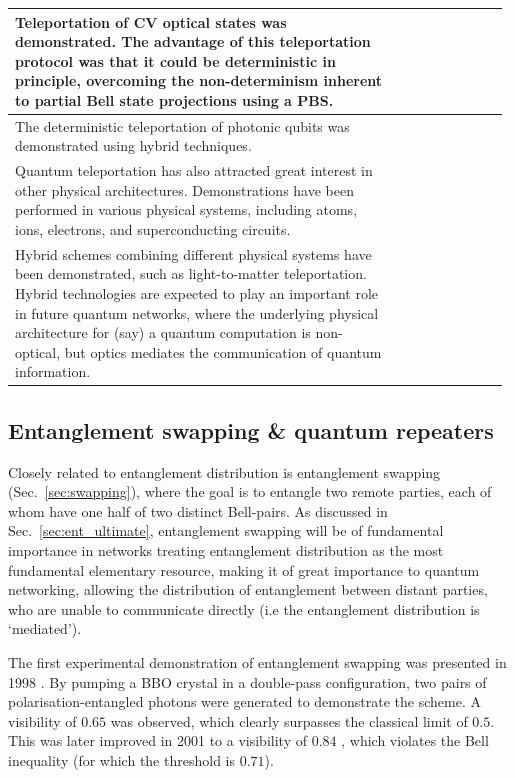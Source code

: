 \documentclass[aps,rmp,twocolumn,amsmath,amssymb,nofootinbib,superscriptaddress,longbibliography,floatfix,table-of-contents,eqsecnum]{revtex4-1}
\begin{document}
\begin{table}[!htb]
\begin{tabular}{|p{0.755\linewidth}|p{0.22\linewidth}|}
	\hline
	Teleportation of CV optical states was demonstrated. The advantage of this teleportation protocol was that it could be deterministic in principle,  overcoming the non-determinism inherent to partial Bell state projections using a PBS. & \cite{bib:Science_282_706} \\
	\hline
	The deterministic teleportation of photonic qubits was demonstrated using hybrid techniques. & \cite{bib:Nat_500_315} \\
	\hline
	Quantum teleportation has also attracted great interest in other physical architectures. Demonstrations have been performed in various physical systems, including atoms, ions, electrons, and superconducting circuits. & \cite{bib:Nat_Phys_9_400, bib:Nat_429_734, bib:Nat_429_737, bib:Science_345_532, bib:Nat_500_319} \\
	\hline
Hybrid schemes combining different physical systems have been demonstrated, such as light-to-matter teleportation. Hybrid technologies are expected to play an important role in future quantum networks, where the underlying physical architecture for (say) a quantum computation is non-optical, but optics mediates the communication of quantum information. & \cite{bib:Nat_443_557, bib:Nat_Comm_4_2744} \\
	\hline
\end{tabular}
\end{table}

%
%

\subsection{Entanglement swapping \& quantum repeaters}  

Closely related to entanglement distribution is entanglement swapping (Sec.~\ref{sec:swapping}), where the goal is to entangle two remote parties, each of whom have one half of two distinct Bell-pairs. As discussed in Sec.~\ref{sec:ent_ultimate}, entanglement swapping will be of fundamental importance in networks treating entanglement distribution as the most fundamental elementary resource, making it of great importance to quantum networking, allowing the distribution of entanglement between distant parties, who are unable to communicate directly (i.e the entanglement distribution is `mediated').

The first experimental demonstration of entanglement swapping was presented in 1998 \cite{bib:PRL_80_3891}. By pumping a BBO crystal in a double-pass configuration, two pairs of polarisation-entangled photons were generated to demonstrate the scheme. A visibility of \mbox{$0.65$} was observed, which clearly surpasses the classical limit of \mbox{$0.5$}. This was later improved in 2001 to a visibility of \mbox{$0.84$} \cite{bib:PRL_86_4435}, which violates the Bell inequality (for which the threshold is $0.71$). 
\end{document}
